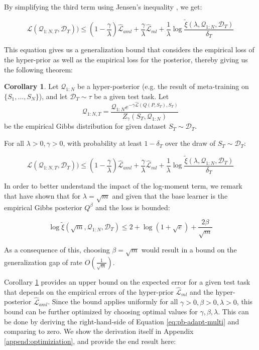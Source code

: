 \documentclass{article}
\theoremstyle{definition}
\newtheorem{corollary}{Corollary}[section]
\begin{document}
By simplifying the third term using Jensen's inequality , we get:

\begin{equation} \label{eq:pb-adapt-multi}
\mathcal{L}(\mathcal{Q}_{1:N,T}, \mathcal{D}_T)) \leq 
(1-\frac{\gamma}{\lambda})\hat{\mathcal{L}}_{aml} + \frac{\gamma}{\lambda}\hat{\mathcal{L}}_{ml} 
+\frac{1}{\lambda}\log\frac{\tilde{\xi}(\lambda,\mathcal{Q}_{1:N},\mathcal{D}_T)}{\delta_T}
\end{equation}

This equation gives us a generalization bound that considers the empirical loss of the hyper-prior as well as the empirical loss for the posterior, thereby giving us the following theorem:

\begin{corollary} \label{thm:main-result-gibbs}
	Let $\mathcal{Q}_{1:N}$ be a hyper-posterior (e.g. the result of meta-training on $\{S_1,...,S_N\}$), and let $\mathcal{D}_T\sim \tau$ be a given test task. Let $$\mathcal{Q}_{1:N,T}= \frac{\mathcal{Q}_{1:N}e^{-\gamma\hat{\mathcal{L}}(Q(P,S_T),S_T)}}{Z_\gamma(S_T, \mathcal{Q}_{1:N})}$$ be the empirical Gibbs distribution for given dataset $S_T\sim \mathcal{D}_T$.
	
	For all $\lambda>0, \gamma>0$, 
	with probability at least $1-\delta_T$ over the draw of $S_T\sim \mathcal{D}_T$:
	
	$$\mathcal{L}(\mathcal{Q}_{1:N,T}, \mathcal{D}_T)) \leq 
	(1-\frac{\gamma}{\lambda})\hat{\mathcal{L}}_{aml} + \frac{\gamma}{\lambda}\hat{\mathcal{L}}_{ml} 
	+\frac{1}{\lambda}\log\frac{\tilde{\xi}(\lambda,\mathcal{Q}_{1:N},\mathcal{D}_T)}{\delta_T}$$
\end{corollary}

In order to better understand the impact of the log-moment term, we remark that \citet{Rivasplata2020} have shown that for $\lambda=\sqrt{m}$ and given that the base learner is the empirical Gibbs posterior $Q^\beta$ and the loss is bounded:

$$\log\tilde{\xi}(\sqrt{m},\mathcal{Q}_{1:N},\mathcal{D}_T) \leq 2+\log(1+\sqrt{e})+\frac{2\beta}{\sqrt{m}} $$

As a consequence of this, choosing $\beta=\sqrt{m}$ would result in a bound on the generalization gap of rate $O(\frac{1}{\sqrt{m}})$.

Corollary \ref{thm:main-result-gibbs} provides an upper bound on the expected error for a given test task that depends on the empirical errors of the hyper-prior $\hat{\mathcal{L}}_{ml}$ and the hyper-posterior $\hat{\mathcal{L}}_{aml}$. 
Since the bound applies uniformly for all $\gamma>0,\beta>0,\lambda>0$, this bound can be further optimized by choosing optimal values for $\gamma, \beta, \lambda$. This can be done by deriving the right-hand-side of Equation \ref{eq:pb-adapt-multi} and comparing to zero. 
We show the derivation itself in Appendix \ref{append:optimiziation}, and provide the end result here:
\end{document}
